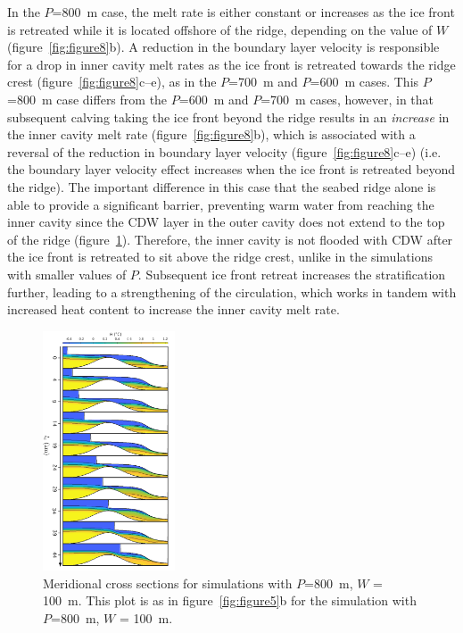 \documentclass[draft]{agujournal2019}
\begin{document}
In the $P$=800~m case, the melt rate is either constant or increases as the ice front is retreated while it is located offshore of the ridge, depending on the value of $W$ (figure~\ref{fig:figure8}b). A reduction in the boundary layer velocity is responsible for a drop in inner cavity melt rates as the ice front is retreated towards the ridge crest (figure~\ref{fig:figure8}c--e), as in the $P$=700~m and $P$=600~m cases. This $P$=800~m case differs from the $P$=600~m and $P$=700~m cases, however, in that subsequent calving taking the ice front beyond the ridge results in an \emph{increase} in the inner cavity melt rate (figure~\ref{fig:figure8}b), which is associated with a reversal of the reduction in boundary layer velocity (figure~\ref{fig:figure8}c--e) (i.e. the boundary layer velocity effect increases when the ice front is retreated beyond the ridge). The important difference in this case that the seabed ridge alone is able to provide a significant barrier, preventing warm water from reaching the inner cavity since the CDW layer in the outer cavity does not extend to the top of the ridge (figure~\ref{fig:figure9}). Therefore, the inner cavity is not flooded with CDW after the ice front is retreated to sit above the ridge crest, unlike in the simulations with smaller values of $P$. Subsequent ice front retreat increases the stratification further, leading to a strengthening of the circulation, which works in tandem with increased heat content to increase the inner cavity melt rate.


\begin{figure}
    \centering
    \includegraphics[width = 0.35\textwidth]{../make_figures/plots/figure9_axislabel.pdf}
    \caption{Meridional cross sections for simulations with $P$=800~m, $W$ = 100~m. This plot is as in figure~\ref{fig:figure5}b for the simulation with $P$=800~m, $W$ = 100~m. }
    \label{fig:figure9}
\end{figure}
\end{document}
